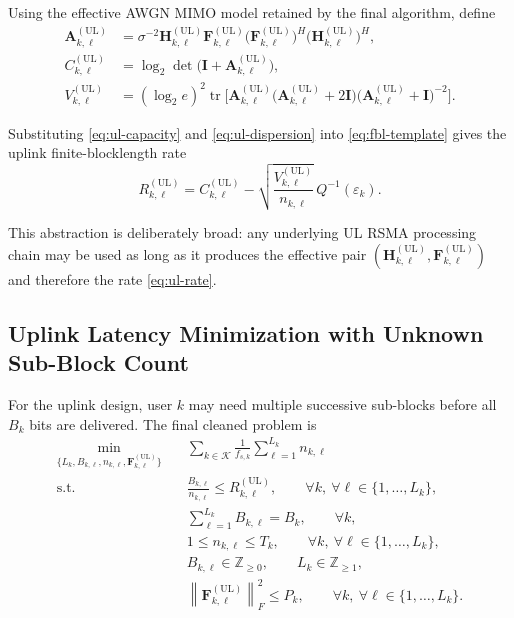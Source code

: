 \documentclass[11pt]{article}
\newcommand{\Kset}{\mathcal{K}}
\newcommand{\F}{\mathbf{F}}
\newcommand{\Hc}{\mathbf{H}}
\newcommand{\I}{\mathbf{I}}
\newcommand{\A}{\mathbf{A}}
\newcommand{\tr}{\operatorname{tr}}
\newcommand{\norm}[1]{\left\lVert #1 \right\rVert}
\newcommand{\UL}{\mathrm{UL}}
\begin{document}
Using the effective AWGN MIMO model retained by the final algorithm, define
\begin{align}
\A_{k,\ell}^{(\UL)}
&=
\sigma^{-2}
\Hc_{k,\ell}^{(\UL)}
\F_{k,\ell}^{(\UL)}
\bigl(\F_{k,\ell}^{(\UL)}\bigr)^H
\bigl(\Hc_{k,\ell}^{(\UL)}\bigr)^H,
\label{eq:ul-a}
\\
C_{k,\ell}^{(\UL)}
&=
\log_2 \det\!\bigl(\I + \A_{k,\ell}^{(\UL)}\bigr),
\label{eq:ul-capacity}
\\
V_{k,\ell}^{(\UL)}
&=
(\log_2 e)^2
\tr\!\Big[
\A_{k,\ell}^{(\UL)}
\bigl(\A_{k,\ell}^{(\UL)} + 2\I\bigr)
\bigl(\A_{k,\ell}^{(\UL)} + \I\bigr)^{-2}
\Big].
\label{eq:ul-dispersion}
\end{align}

Substituting \eqref{eq:ul-capacity} and \eqref{eq:ul-dispersion} into \eqref{eq:fbl-template} gives the uplink finite-blocklength rate
\begin{equation}
R_{k,\ell}^{(\UL)}
=
C_{k,\ell}^{(\UL)}
-
\sqrt{\frac{V_{k,\ell}^{(\UL)}}{n_{k,\ell}}}\,
Q^{-1}(\varepsilon_k).
\label{eq:ul-rate}
\end{equation}

This abstraction is deliberately broad: any underlying UL RSMA processing chain may be used as long as it produces the effective pair $(\Hc_{k,\ell}^{(\UL)}, \F_{k,\ell}^{(\UL)})$ and therefore the rate \eqref{eq:ul-rate}.

\subsection{Uplink Latency Minimization with Unknown Sub-Block Count}
For the uplink design, user $k$ may need multiple successive sub-blocks before all $B_k$ bits are delivered. The final cleaned problem is
\begin{subequations}
\begin{align}
\min_{\{L_k,B_{k,\ell},n_{k,\ell},\F_{k,\ell}^{(\UL)}\}}
\quad
&
\sum_{k \in \Kset}\frac{1}{f_{s,k}}\sum_{\ell=1}^{L_k} n_{k,\ell}
\label{prob:ul-main-obj}
\\
\text{s.t.}\quad
&
\frac{B_{k,\ell}}{n_{k,\ell}}
\le
R_{k,\ell}^{(\UL)},
\qquad
\forall k,\ \forall \ell \in \{1,\dots,L_k\},
\label{prob:ul-rate}
\\
&
\sum_{\ell=1}^{L_k} B_{k,\ell} = B_k,
\qquad
\forall k,
\label{prob:ul-payload}
\\
&
1 \le n_{k,\ell} \le T_k,
\qquad
\forall k,\ \forall \ell \in \{1,\dots,L_k\},
\label{prob:ul-blocklength}
\\
&
B_{k,\ell} \in \mathbb{Z}_{\ge 0},
\qquad
L_k \in \mathbb{Z}_{\ge 1},
\label{prob:ul-integrality}
\\
&
\norm{\F_{k,\ell}^{(\UL)}}_F^2 \le P_k,
\qquad
\forall k,\ \forall \ell \in \{1,\dots,L_k\}.
\label{prob:ul-power}
\end{align}
\end{subequations}
\end{document}
